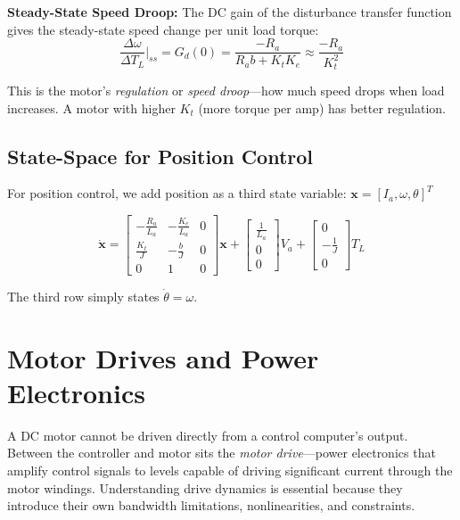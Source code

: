 \textbf{Steady-State Speed Droop:} The DC gain of the disturbance transfer function gives the steady-state speed change per unit load torque:
\begin{equation}
    \frac{\Delta \omega}{\Delta T_L}\bigg|_{ss} = G_d(0) = \frac{-R_a}{R_a b + K_t K_e} \approx \frac{-R_a}{K_t^2}
\end{equation}

This is the motor's \textit{regulation} or \textit{speed droop}---how much speed drops when load increases. A motor with higher $K_t$ (more torque per amp) has better regulation.

\subsection{State-Space for Position Control}

For position control, we add position as a third state variable: $\mathbf{x} = [I_a, \omega, \theta]^T$

\begin{equation}
    \dot{\mathbf{x}} = \begin{bmatrix} -\frac{R_a}{L_a} & -\frac{K_e}{L_a} & 0 \\[6pt] \frac{K_t}{J} & -\frac{b}{J} & 0 \\[6pt] 0 & 1 & 0 \end{bmatrix} \mathbf{x} + \begin{bmatrix} \frac{1}{L_a} \\[6pt] 0 \\[6pt] 0 \end{bmatrix} V_a + \begin{bmatrix} 0 \\[6pt] -\frac{1}{J} \\[6pt] 0 \end{bmatrix} T_L
    \label{eq:motor_state_space_position}
\end{equation}

The third row simply states $\dot{\theta} = \omega$.

\section{Motor Drives and Power Electronics}
\label{sec:motor_drives}

A DC motor cannot be driven directly from a control computer's output. Between the controller and motor sits the \textit{motor drive}---power electronics that amplify control signals to levels capable of driving significant current through the motor windings. Understanding drive dynamics is essential because they introduce their own bandwidth limitations, nonlinearities, and constraints.


